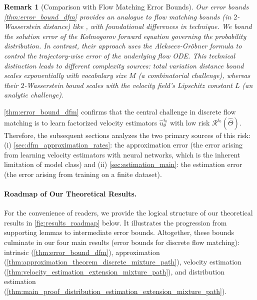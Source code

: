 \documentclass[12pt]{article}
\numberwithin{equation}{section}
\let\hat\widehat
\newcommand{\wh}{\widehat}
\renewcommand{\hat}{\wh}
\let\cite\citep
\theoremstyle{theoremstyle}
\newtheorem{remark}{Remark}[section]
\numberwithin{equation}{section}
\numberwithin{theorem}{section}
\numberwithin{proposition}{section}
\numberwithin{definition}{section}
\numberwithin{lemma}{section}
\numberwithin{assumption}{section}
\numberwithin{remark}{section}
\begin{document}
\begin{remark}[Comparison with Flow Matching Error Bounds]
Our error bounds \cref{thm:error_bound_dfm} provides an analogue to flow matching bounds (in $2$-Wasserstein distance) like \cite{benton2023error}, with foundational differences in technique.
We bound the solution error of the Kolmogorov forward equation governing the probability distribution. 
In contrast, their approach uses the Alekseev-Gröbner formula to control the trajectory-wise error of the underlying flow ODE. 
This technical distinction leads to different complexity sources: total variation distance bound scales exponentially with vocabulary size $M$ (a combinatorial challenge), whereas their $2$-Wasserstein bound scales with the velocity field's Lipschitz constant $L$ (an analytic challenge).
\end{remark}


\cref{thm:error_bound_dfm} confirms that the central challenge in discrete flow matching is to learn factorized velocity estimators $\hat{u}_{\theta}^{i_0}$ with low risk $\mathcal{R}^{i_0}(\hat{\Theta})$. 
Therefore, the subsequent sections analyzes the two primary sources of this risk: (i) \cref{sec:dfm_approximation_rates}: the approximation error (the error arising from  learning velocity estimators with neural networks, which is the inherent limitation of model class) and (ii) \cref{sec:estimation_main}: the estimation error (the error arising from training on a finite dataset).



\paragraph{Roadmap of Our Theoretical Results.}
For the convenience of readers, 
we provide the logical structure of our theoretical results in \cref{fig:results_roadmap} below.
It illustrates the progression from supporting lemmas to intermediate error bounds. 
Altogether, these bounds culminate in our four main results (error bounds for discrete flow matching): intrinsic (\cref{thm:error_bound_dfm}), approximation (\cref{thm:approximation_theorem_discrete_mixture_path}), velocity estimation (\cref{thm:velocity_estimation_extension_mixture_path}), and distribution estimation (\cref{thm:main_proof_distribution_estimation_extension_mixture_path}). 
\end{document}
